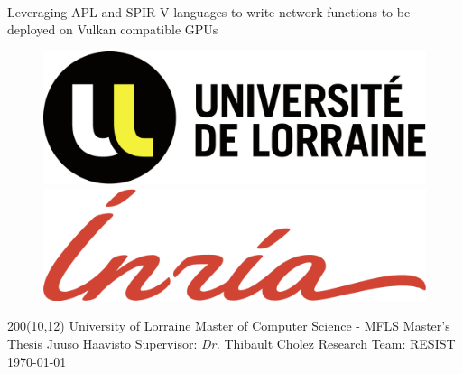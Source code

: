 \documentclass{IEEEtran}
\begin{document}
\begin{titlepage}
    $ $ %
    \vspace{7cm}
    \begin{center}
        \huge{Leveraging APL and SPIR-V languages to write network functions to be deployed on Vulkan compatible GPUs}
    \end{center}

    \begin{figure}[ht]
        \centering
        \begin{minipage}[b]{0.25\textwidth}
            \includegraphics[width=\textwidth]{./assets/ul.png}
        \end{minipage}
        \quad \quad %
        \begin{minipage}[b]{0.25\textwidth}
            \includegraphics[width=\textwidth]{./assets/inria.png}
        \end{minipage}
    \end{figure}

    \begin{textblock}{200}(10,12)%
    \obeylines
    \setlength{\parskip}{0cm}
        University of Lorraine
        Master of Computer Science - MFLS
        Master's Thesis
        Juuso Haavisto
        Supervisor: \textit{Dr.} Thibault Cholez
        Research Team: RESIST
        \today
    \end{textblock}%

\end{titlepage}

\tableofcontents

\newpage
\end{document}
